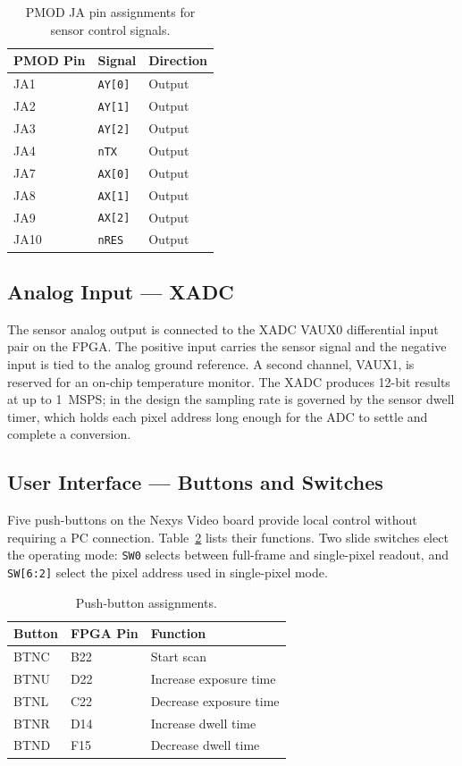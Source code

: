 \begin{table}[htpb]
\centering
\caption{PMOD JA pin assignments for sensor control signals.}
\label{tab:pmod_ja}
\begin{tabular}{lll}
\hline
\textbf{PMOD Pin} & \textbf{Signal} & \textbf{Direction} \\
\hline
JA1  & \texttt{AY[0]} & Output \\
JA2  & \texttt{AY[1]} & Output \\
JA3  & \texttt{AY[2]} & Output \\
JA4  & \texttt{nTX}   & Output \\
JA7  & \texttt{AX[0]} & Output \\
JA8  & \texttt{AX[1]} & Output \\
JA9  & \texttt{AX[2]} & Output \\
JA10 & \texttt{nRES}  & Output \\
\hline
\end{tabular}
\end{table}

\subsection{Analog Input --- XADC}

The sensor analog output is connected to the XADC VAUX0 differential input pair on the FPGA. The positive input carries the sensor signal and the negative input is tied to the analog ground reference. A second channel, VAUX1, is reserved for an on-chip temperature monitor. The XADC produces 12-bit results at up to 1~MSPS; in the design the sampling rate is governed by the sensor dwell timer, which holds each pixel address long enough for the ADC to settle and complete a conversion.

\subsection{User Interface --- Buttons and Switches}

Five push-buttons on the Nexys Video board provide local control without requiring a PC connection. Table~\ref{tab:buttons} lists their functions. Two slide switches elect the operating mode: \texttt{SW0} selects between full-frame and single-pixel readout, and \texttt{SW[6:2]} select the pixel address used in single-pixel mode.

\begin{table}[htbp]
\centering
\caption{Push-button assignments.}
\label{tab:buttons}
\begin{tabular}{lll}
\hline
\textbf{Button} & \textbf{FPGA Pin} & \textbf{Function} \\
\hline
BTNC & B22 & Start scan \\
BTNU & D22 & Increase exposure time \\
BTNL & C22 & Decrease exposure time \\
BTNR & D14 & Increase dwell time \\
BTND & F15 & Decrease dwell time \\
\hline
\end{tabular}
\end{table}

